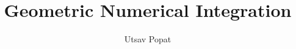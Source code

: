 \documentclass[pdf]{beamer}
\title{Geometric Numerical Integration}
\subtitle{}
\author{Utsav Popat}
\begin{document}
\begin{frame}
	\titlepage
\end{frame}
\end{document}
